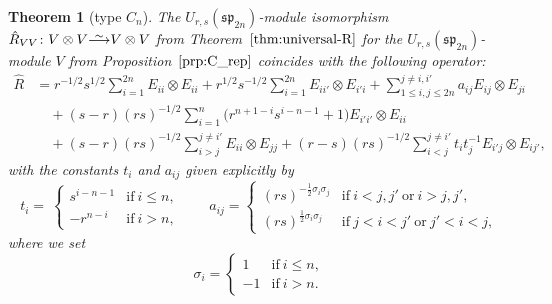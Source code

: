 \documentclass[pdftex]{sigma}
\numberwithin{equation}{section}
\newtheorem{Theorem}{Theorem}[section]
\newcommand{\ssp}{\mathfrak{sp}}
\newcommand\iso{ \vphantom{j^{X^2}}\smash{\overset{\sim}{\vphantom{\rule{0pt}{0.20em}}\smash{\longrightarrow}}} }
\begin{document}
\begin{Theorem}[type $C_{n}$]\label{thm:C_RMatrix}
The $U_{r,s}(\ssp_{2n})$-module isomorphism $\hat{R}_{VV}\colon V \otimes V \iso V \otimes V$ from Theorem~$\ref{thm:universal-R}$ for the $U_{r,s}(\ssp_{2n})$-module $V$ from Proposition~$\ref{prp:C_rep}$ coincides with the following operator:
\begin{align}
 \hat{R} &{}=
 r^{-1/2}s^{1/2}\sum_{i = 1}^{2n} E_{ii} \otimes E_{ii} +
 r^{1/2}s^{-1/2}\sum_{i = 1}^{2n} E_{ii'} \otimes E_{i'i}+ \sum_{1\leq i,j\leq 2n}^{j \ne i,i'} a_{ij}E_{ij} \otimes E_{ji} \nonumber\\
 &\quad{}
 + (s - r)(rs)^{-1/2}\sum_{i = 1}^{n} \bigl(r^{n+ 1 - i}s^{i - n - 1} + 1\bigr)E_{i'i'} \otimes E_{ii} \nonumber\\
 &\quad{} + (s - r)(rs)^{-1/2}\sum_{i > j}^{j \neq i'} E_{ii} \otimes E_{jj}
 + (r - s)(rs)^{-1/2}\sum_{i < j}^{j \neq i'} t_{i}t_{j}^{-1}E_{i'j} \otimes E_{ij'} ,\label{eq:C_RMatrix}
\end{align}
with the constants $t_i$ and $a_{ij}$ given explicitly by
\begin{equation}\label{eq:C_coeffs}
 t_{i} = \
 \begin{cases}
 s^{i - n - 1} & \text{if}\ i \le n, \\
 -r^{n - i} & \text{if}\ i > n,
 \end{cases} \qquad
 a_{ij} =
 \begin{cases}
 (rs)^{-\frac{1}{2}\sigma_{i}\sigma_{j}} & \text{if}\ i < j,j'\ \text{or}\ i > j,j', \\
 (rs)^{\frac{1}{2}\sigma_{i}\sigma_{j}} & \text{if}\ j < i < j'\ \text{or}\ j' < i < j,
 \end{cases}
\end{equation}
where we set
\begin{displaymath}
 \sigma_{i} =
 \begin{cases}
 1 & \text{if}\ i \le n, \\
 -1 & \text{if}\ i > n.
 \end{cases}
\end{displaymath}
\end{Theorem}
\end{document}
